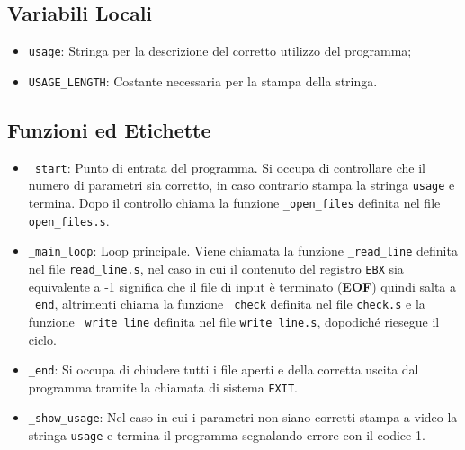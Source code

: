 \documentclass[a4paper,11pt]{article}
\newcommand{\itemtt}[1]{\item \texttt{#1}}
\newcommand{\myparagraph}[2]{
	\begin{table}[!ht]
		\begin{tabular}{p{0.175\linewidth} | p{0.8\linewidth}}
			\texttt{#1} & #2
		\end{tabular}
	\end{table}
			}
\begin{document}
		\subsection{Variabili Locali}
	\begin{itemize}
		\itemtt{usage}: Stringa per la descrizione del corretto utilizzo del programma;
		\itemtt{USAGE\_LENGTH}: Costante necessaria per la stampa della stringa.
	\end{itemize}
	
		\subsection{Funzioni ed Etichette}
		
%		
%		
%		
%		
\begin{itemize}
		\itemtt{\_start}: Punto di entrata del programma. Si occupa di controllare che il numero di parametri sia corretto, in caso contrario stampa la stringa \texttt{usage} e termina. Dopo il controllo chiama la funzione \texttt{\_open\_files} definita nel file \texttt{open\_files.s}. 
    	\itemtt{\_main\_loop}: Loop principale. Viene chiamata la funzione \texttt{\_read\_line} definita nel file \texttt{read\_line.s}, nel caso in cui il contenuto del registro \texttt{EBX} sia equivalente a -1 significa che il file di input è terminato (\textbf{EOF}) quindi salta a \texttt{\_end}, altrimenti chiama la funzione \texttt{\_check} definita nel file \texttt{check.s} e la funzione \texttt{\_write\_line} definita nel file \texttt{write\_line.s}, dopodiché riesegue il ciclo.
		\itemtt{\_end}: Si occupa di chiudere tutti i file aperti e della corretta uscita dal programma tramite la chiamata di sistema \texttt{EXIT}.
		\itemtt{\_show\_usage}: Nel caso in cui i parametri non siano corretti stampa a video la stringa \texttt{usage} e termina il programma segnalando errore con il codice 1.
	\end{itemize}  
	
\end{document}
